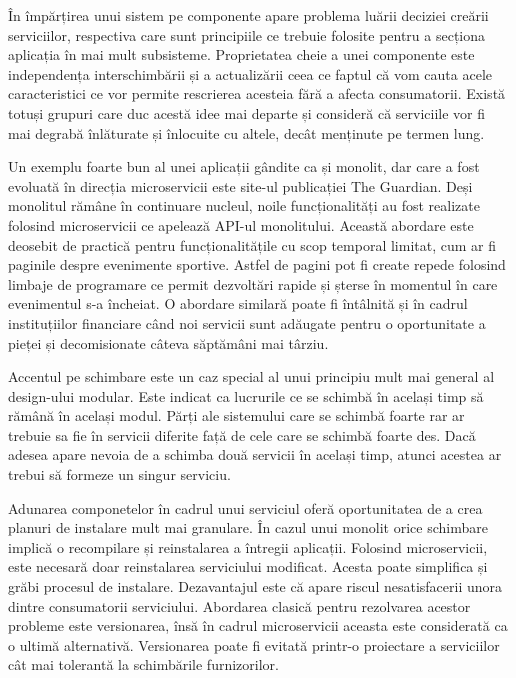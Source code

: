 \documentclass[12pt, a4paper, oneside, romanian]{teza-upb}
\begin{document}
În împărțirea unui sistem pe componente apare problema luării deciziei creării serviciilor, respectiva care sunt principiile ce trebuie folosite pentru a secționa aplicația în mai mult subsisteme. Proprietatea cheie a unei componente este independența interschimbării și a actualizării ceea ce faptul că vom cauta acele caracteristici ce vor permite rescrierea acesteia fără a afecta consumatorii. Există totuși grupuri care duc acestă idee mai departe și consideră că serviciile vor fi mai degrabă înlăturate și înlocuite cu altele, decât menținute pe termen lung. 

Un exemplu foarte bun al unei aplicații gândite ca și monolit, dar care a fost evoluată în direcția microservicii este site-ul publicației The Guardian. Deși monolitul rămâne în continuare nucleul, noile funcționalități au fost realizate folosind microservicii ce apelează API-ul monolitului. Această abordare este deosebit de practică pentru funcționalitățile cu scop temporal limitat, cum ar fi paginile despre evenimente sportive. Astfel de pagini pot fi create repede folosind limbaje de programare ce permit dezvoltări rapide și șterse în momentul în care evenimentul s-a încheiat. O abordare similară poate fi întâlnită și în cadrul instituțiilor financiare când noi servicii sunt adăugate pentru o oportunitate a pieței și decomisionate câteva săptămâni mai târziu. 

Accentul pe schimbare este un caz special al unui principiu mult mai general al design-ului modular. Este indicat ca lucrurile ce se schimbă în același timp să rămână în același modul. Părți ale sistemului care se schimbă foarte rar ar trebuie sa fie în servicii diferite față de cele care se schimbă foarte des. Dacă adesea apare nevoia de a schimba două servicii în același timp, atunci acestea ar trebui să formeze un singur serviciu. 

Adunarea componetelor în cadrul unui serviciul oferă oportunitatea de a crea planuri de instalare mult mai granulare. În cazul unui monolit orice schimbare implică o recompilare și reinstalarea a întregii aplicații. Folosind microservicii, este necesară doar reinstalarea serviciului modificat. Acesta poate simplifica și grăbi procesul de instalare. Dezavantajul este că apare riscul nesatisfacerii unora dintre consumatorii serviciului. Abordarea clasică pentru rezolvarea acestor probleme este versionarea, însă în cadrul microservicii aceasta este considerată ca o ultimă alternativă. Versionarea poate fi evitată printr-o proiectare a serviciilor cât mai tolerantă la schimbările furnizorilor. 
\newpage
\end{document}
